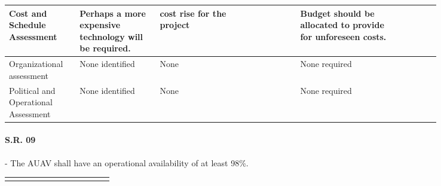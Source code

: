 \begin{fullwidth}
\begin{landscape}
{\begin{longtable}{| L{0.12\linewidth} | L{0.16\linewidth} |  L{0.20\linewidth} | L{0.08\linewidth} | L{0.20\linewidth} | L{0.08\linewidth} |}
        \hline
        Cost and Schedule \newline Assessment & Perhaps a more expensive technology will be required.  & cost rise for the project  &   & Budget should be allocated to provide for unforeseen costs. &   \\
        \hline
        Organizational assessment & None identified  & None & & None required  &  \\
        \hline
        Political and Operational Assessment & None identified & None &  & None required & 
        \label{tab:sr08_feasibility}
    \end{longtable}
    }
    
    \newpage
    
    
    \paragraph{S.R. 09} - The AUAV shall have an operational availability of at least 98\%.
    
    {\fontsize{10pt}{11pt}\selectfont
    \begin{longtable}{| L{0.12\linewidth} | L{0.16\linewidth} |  L{0.20\linewidth} | L{0.08\linewidth} | L{0.20\linewidth} | L{0.08\linewidth} |}
        \hline \endlastfoot
        

\end{longtable}}
\end{landscape}
\end{fullwidth}
